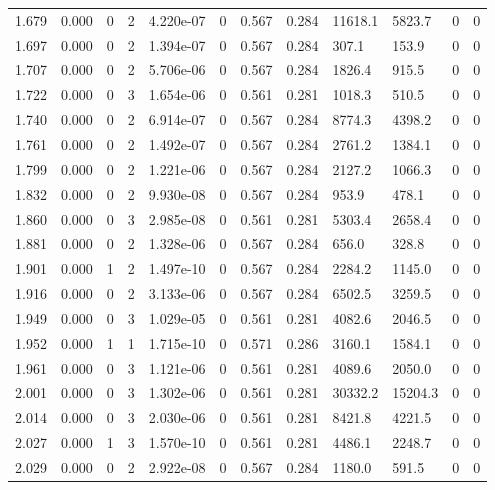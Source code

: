 \documentclass[preview]{standalone}
\begin{document}
{{{\begin{tabular}{L{1.2cm}C{1.2cm} C{0.3cm}C{0.5cm} C{1.4cm}C{1.4cm} C{1.4cm}C{1.4cm} C{1.6cm}C{1.6cm} C{1.6cm}C{1.6cm}}
  1.679  &  0.000  & 0     &  2 &  4.220e-07  & 0  &  0.567&   0.284& 11618.1 & 5823.7   &  0 & 0  \\ 
  1.697  &  0.000  & 0     &  2 &  1.394e-07  & 0  &  0.567&   0.284& 307.1 & 153.9   &  0 & 0  \\ 
  1.707  &  0.000  & 0     &  2 &  5.706e-06  & 0  &  0.567&   0.284& 1826.4 & 915.5   &  0 & 0  \\ 
  1.722  &  0.000  & 0     &  3 &  1.654e-06  & 0  &  0.561&   0.281& 1018.3 & 510.5   &  0 & 0  \\ 
  1.740  &  0.000  & 0     &  2 &  6.914e-07  & 0  &  0.567&   0.284& 8774.3 & 4398.2   &  0 & 0  \\ 
  1.761  &  0.000  & 0     &  2 &  1.492e-07  & 0  &  0.567&   0.284& 2761.2 & 1384.1   &  0 & 0  \\ 
  1.799  &  0.000  & 0     &  2 &  1.221e-06  & 0  &  0.567&   0.284& 2127.2 & 1066.3   &  0 & 0  \\ 
  1.832  &  0.000  & 0     &  2 &  9.930e-08  & 0  &  0.567&   0.284& 953.9 & 478.1   &  0 & 0  \\ 
  1.860  &  0.000  & 0     &  3 &  2.985e-08  & 0  &  0.561&   0.281& 5303.4 & 2658.4   &  0 & 0  \\ 
  1.881  &  0.000  & 0     &  2 &  1.328e-06  & 0  &  0.567&   0.284& 656.0 & 328.8   &  0 & 0  \\ 
  1.901  &  0.000  & 1     &  2 &  1.497e-10  & 0  &  0.567&   0.284& 2284.2 & 1145.0   &  0 & 0  \\ 
  1.916  &  0.000  & 0     &  2 &  3.133e-06  & 0  &  0.567&   0.284& 6502.5 & 3259.5   &  0 & 0  \\ 
  1.949  &  0.000  & 0     &  3 &  1.029e-05  & 0  &  0.561&   0.281& 4082.6 & 2046.5   &  0 & 0  \\ 
  1.952  &  0.000  & 1     &  1 &  1.715e-10  & 0  &  0.571&   0.286& 3160.1 & 1584.1   &  0 & 0  \\ 
  1.961  &  0.000  & 0     &  3 &  1.121e-06  & 0  &  0.561&   0.281& 4089.6 & 2050.0   &  0 & 0  \\ 
  2.001  &  0.000  & 0     &  3 &  1.302e-06  & 0  &  0.561&   0.281& 30332.2 & 15204.3   &  0 & 0  \\ 
  2.014  &  0.000  & 0     &  3 &  2.030e-06  & 0  &  0.561&   0.281& 8421.8 & 4221.5   &  0 & 0  \\ 
  2.027  &  0.000  & 1     &  3 &  1.570e-10  & 0  &  0.561&   0.281& 4486.1 & 2248.7   &  0 & 0  \\ 
  2.029  &  0.000  & 0     &  2 &  2.922e-08  & 0  &  0.567&   0.284& 1180.0 & 591.5   &  0 & 0  \\ 

\end{tabular}}}}
\end{document}
